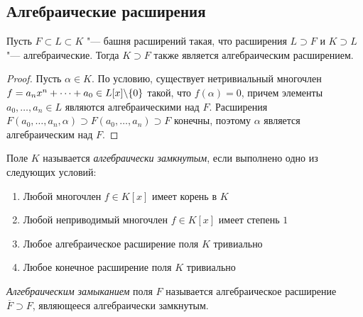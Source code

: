 \subsection{Алгебраические расширения}

\begin{proposition}
	Пусть $F \subset L \subset K$ "--- башня расширений такая, что расширения $L \supset F$ и $K \supset L$ "--- алгебраические. Тогда $K \supset F$ также является алгебраическим расширением.
\end{proposition}
\pagebreak
\begin{proof}
	Пусть $\alpha \in K$. По условию, существует нетривиальный многочлен $f \hm= a_nx^n + \dotsb + a_0 \in L[x] \backslash \{0\}$ такой, что $f(\alpha) = 0$, причем элементы $a_0, \dotsc, a_n \in L$ являются алгебраическими над $F$. Расширения $F(a_0, \dotsc, a_n, \alpha) \supset F(a_0, \dotsc, a_n) \supset F$ конечны, поэтому $\alpha$ является алгебраическим над $F$.
\end{proof}

\begin{definition}
	Поле $K$ называется \textit{алгебраически замкнутым}, если выполнено одно из следующих условий:
	\begin{enumerate}
		\item Любой многочлен $f \in K[x]$ имеет корень в $K$
		\item Любой неприводимый многочлен $f \in K[x]$ имеет степень $1$
		\item Любое алгебраическое расширение поля $K$ тривиально
		\item Любое конечное расширение поля $K$ тривиально
	\end{enumerate}
\end{definition}



\begin{definition}
	\textit{Алгебраическим замыканием} поля $F$ называется алгебраическое расширение $\overline{F} \supset F$, являющееся алгебраически замкнутым.
\end{definition}